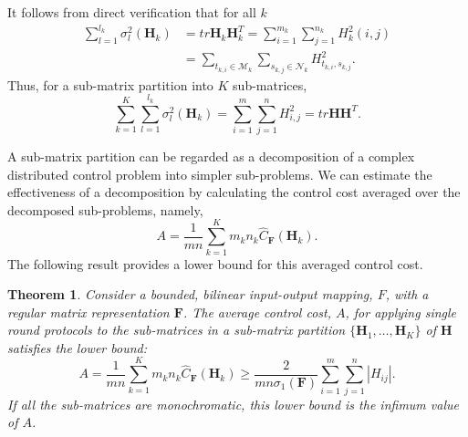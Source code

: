 \documentclass[12pt,onecolumn,draftcls]{IEEEtran}
\newcommand{\bH}{\mathbf{H}}
\newtheorem{theorem}{Theorem}[section]
\begin{document}
It follows from direct verification that for all $k$
\begin{align}
\sum_{l=1}^{l_k} \sigma_l^2 (\mathbf{H}_k) &= tr \mathbf{H}_k\mathbf{H}_k^T
=\sum_{i=1}^{m_k} \sum_{j=1}^{n_k} H_k^2 (i,j)\\
&=\sum_{t_{k,i} \in \mathcal{M}_k} \sum_{s_{k,j} \in \mathcal{N}_k} H_{t_{k,i},s_{k,j}}^2.
\label{eqn:prop6.2}
\end{align}
Thus, for a sub-matrix partition into $K$ sub-matrices,
\begin{equation}
\sum_{k=1}^K \sum_{l=1}^{l_k} \sigma_l^2(\mathbf{H}_k) = \sum_{i=1}^{m} \sum_{j=1}^{n} H^2_{i,j} = tr \mathbf{H}\mathbf{H}^T.
\label{eqn:prop6.3}
\end{equation}

A sub-matrix partition can be regarded as a decomposition of a complex distributed control problem into simpler
sub-problems.  We can estimate the effectiveness of a decomposition by calculating the control cost averaged
over the decomposed sub-problems, namely,
\begin{equation}
A  = \frac{1}{mn} \sum_{k=1}^K m_k n_k \hat{C}_{\mathbf{F}}(\bH_k).
\end{equation}
The following result provides a lower bound for this averaged control cost.

\begin{theorem}
\label{thm:2}
Consider a bounded, bilinear input-output mapping, $F$, with a regular matrix representation $\mathbf{F}$.
The average control cost, $A$, for applying single round protocols to the sub-matrices in a sub-matrix partition
$\{ \mathbf{H}_1, \ldots, \mathbf{H}_K \}$ of $\mathbf{H}$ satisfies the lower bound:
\begin{equation}
A  = \frac{1}{mn} \sum_{k=1}^K m_k n_k \hat{C}_{\mathbf{F}}(\bH_k)
\geq 
\frac{2}{mn\sigma_{1}(\mathbf{F})} \sum_{i=1}^{m} \sum_{j=1}^{n} |H_{ij}|.
\label{eq:thm7.1}
\end{equation}
If all the sub-matrices are monochromatic, this lower bound is the infimum value of $A$.
\end{theorem}
\end{document}
